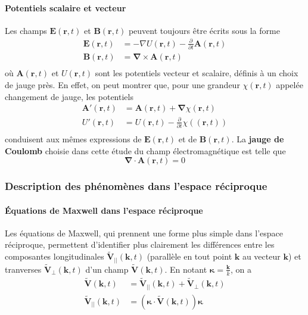         \paragraph{Potentiels scalaire et vecteur} 

        Les champs $\mathbf{E}(\mathbf{r}, t)$ et $\mathbf{B}(\mathbf{r}, t) $ peuvent toujours être écrits sous la forme 
        \begin{align*}
            \mathbf{E}(\mathbf{r}, t) &= - \nabla U(\mathbf{r}, t) - \frac{\partial }{\partial t} \mathbf{A}(\mathbf{r}, t) \\
            \mathbf{B}(\mathbf{r}, t) &= \symbf{\nabla} \times \mathbf{A} (\mathbf{r}, t) \\
        \end{align*}
        où $\mathbf{A}(\mathbf{r},t)$ et $U(\mathbf{r}, t) $ sont les potentiels vecteur et scalaire, définis à un choix de jauge près. En effet, on peut montrer que, pour une grandeur $\chi(\mathbf{r},t)$ appelée changement de jauge, les potentiels 
        \begin{align*}
            \mathbf{A}'(\mathbf{r}, t) &= \mathbf{A}(\mathbf{r}, t) + \symbf{\nabla} \chi(\mathbf{r}, t) \\
            U'(\mathbf{r}, t) &= U(\mathbf{r}, t) - \frac{\partial }{\partial t} \chi((\mathbf{r}, t) ) \\
        \end{align*}
        conduisent aux mêmes expressions de $\mathbf{E}(\mathbf{r},t)$ et de $\mathbf{B}(\mathbf{r}, t) $. La \textbf{jauge de Coulomb} choisie dans cette étude du champ électromagnétique est telle que 
        \[ \symbf{\nabla} \cdot \mathbf{A} (\mathbf{r}, t) = 0 \]

        \subsubsection{Description des phénomènes dans l’espace réciproque}

            \paragraph{Équations de Maxwell dans l’espace réciproque}

            Les équations de Maxwell, qui prennent une forme plus simple dans l’espace réciproque, permettent d’identifier plus clairement les différences entre les composantes longitudinales $\tilde{\mathbf{V}}_{||}(\mathbf{k}, t)$ (parallèle en tout point $\mathbf{k}$ au vecteur $\mathbf{k}$) et tranverses $\tilde{\mathbf{V}}_{\perp}(\mathbf{k}, t)$ d’un champ $\tilde{\mathbf{V}}(\mathbf{k}, t)$. En notant $\symbf{\kappa} = \frac{\mathbf{k}}{k}$, on a 
            \begin{align*}
                \tilde{\mathbf{V}}(\mathbf{k}, t) &= \tilde{\mathbf{V}}_{||}(\mathbf{k}, t) + \tilde{\mathbf{V}}_{\perp}(\mathbf{k}, t) \\
                \tilde{\mathbf{V}}_{||}(\mathbf{k}, t) &= \left(\symbf{\kappa} \cdot \tilde{\mathbf{V}}(\mathbf{k}, t)\right) \symbf{\kappa} \\
            \end{align*}

